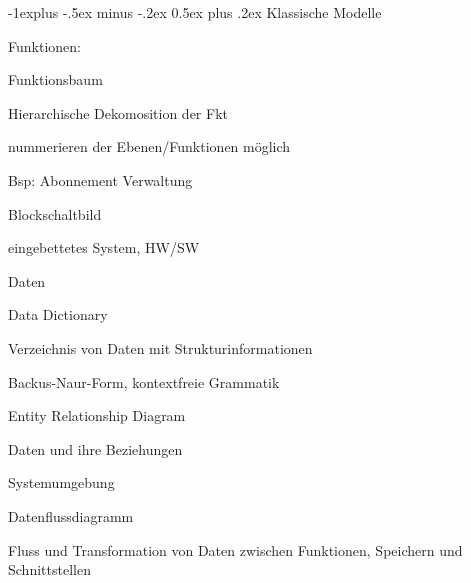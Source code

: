 \documentclass[a4paper]{article}
\makeatletter
\renewcommand{\subsection}{\@startsection{subsection}{2}{0mm}%
                                {-1explus -.5ex minus -.2ex}%
                                {0.5ex plus .2ex}%
                                {\normalfont\normalsize\bfseries}}
\makeatother
\begin{document}
\begin{multicols}{3}
  \subsection{Klassische Modelle}
  \begin{itemize*}
    \item Funktionen:
          \begin{itemize*}
            \item Funktionsbaum
                  \begin{itemize*}
                    \item Hierarchische Dekomosition der Fkt
                    \item nummerieren der Ebenen/Funktionen möglich
                    \item Bsp: Abonnement Verwaltung
                  \end{itemize*}
            \item Blockschaltbild
                  \begin{itemize*}
                    \item eingebettetes System, HW/SW
                  \end{itemize*}
          \end{itemize*}
    \item Daten
          \begin{itemize*}
            \item Data Dictionary
                  \begin{itemize*}
                    \item Verzeichnis von Daten mit Strukturinformationen
                    \item Backus-Naur-Form, kontextfreie Grammatik
                  \end{itemize*}
            \item Entity Relationship Diagram
                  \begin{itemize*}
                    \item Daten und ihre Beziehungen
                  \end{itemize*}
          \end{itemize*}
    \item Systemumgebung
          \begin{itemize*}
            \item Datenflussdiagramm
                  \begin{itemize*}
                    \item Fluss und Transformation von Daten zwischen Funktionen, Speichern und Schnittstellen

\end{itemize*}
\end{itemize*}
\end{itemize*}
\end{multicols}
\end{document}
